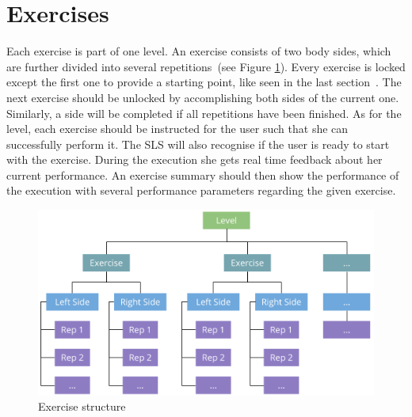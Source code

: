 \section{Exercises}\label{4_4_exercises}
Each exercise is part of one level. An exercise consists of two body sides, which are further divided into several repetitions~(see Figure \ref{fig:exerciseStructure}). Every exercise is locked except the first one to provide a starting point, like seen in the last section~. The next exercise should be unlocked by accomplishing both sides of the current one. Similarly, a side will be completed if all repetitions have been finished. As for the level, each exercise should be instructed for the user such that she can successfully perform it. The SLS will also recognise if the user is ready to start with the exercise. During the execution she gets real time feedback about her current performance. An exercise summary should then show the performance of the execution with several performance parameters regarding the given exercise.
\begin{figure}[htb]
	\centering
	\begin{minipage}[t]{1\linewidth}
		\centering
		\includegraphics[width=1\linewidth]{Pictures/exerciseStructureTopDown3}
		\caption{Exercise structure}
		\label{fig:exerciseStructure}
	\end{minipage}
\end{figure}

